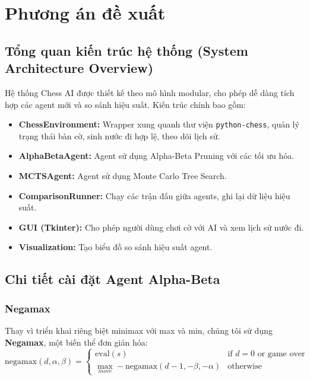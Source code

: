\section{Phương án đề xuất}

\subsection{Tổng quan kiến trúc hệ thống (System Architecture Overview)}
Hệ thống Chess AI được thiết kế theo mô hình modular, cho phép dễ dàng tích hợp các agent mới và so sánh hiệu suất. Kiến trúc chính bao gồm:

\begin{itemize}
    \item \textbf{ChessEnvironment:} Wrapper xung quanh thư viện \texttt{python-chess}, quản lý trạng thái bàn cờ, sinh nước đi hợp lệ, theo dõi lịch sử.
    \item \textbf{AlphaBetaAgent:} Agent sử dụng Alpha-Beta Pruning với các tối ưu hóa.
    \item \textbf{MCTSAgent:} Agent sử dụng Monte Carlo Tree Search.
    \item \textbf{ComparisonRunner:} Chạy các trận đấu giữa agents, ghi lại dữ liệu hiệu suất.
    \item \textbf{GUI (Tkinter):} Cho phép người dùng chơi cờ với AI và xem lịch sử nước đi.
    \item \textbf{Visualization:} Tạo biểu đồ so sánh hiệu suất agent.
\end{itemize}

\subsection{Chi tiết cài đặt Agent Alpha-Beta}

\subsubsection{Negamax}
Thay vì triển khai riêng biệt minimax với max và min, chúng tôi sử dụng \textbf{Negamax}, một biến thể đơn giản hóa:
\begin{equation*}
\text{negamax}(d, \alpha, \beta) = \begin{cases}
\text{eval}(s) & \text{if } d = 0 \text{ or game over} \\
\max_{move} -\text{negamax}(d-1, -\beta, -\alpha) & \text{otherwise}
\end{cases}
\end{equation*}

